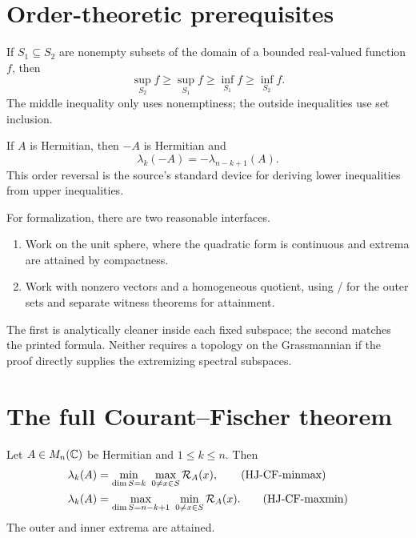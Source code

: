 \section{Order-theoretic prerequisites}


If $S_1\subseteq S_2$ are nonempty subsets of the domain of a bounded real-valued function $f$, then
\begin{equation}
  \sup_{S_2}f\ge\sup_{S_1}f\ge\inf_{S_1}f\ge\inf_{S_2}f. \tag{HJ-set-chain}
\end{equation}
The middle inequality only uses nonemptiness; the outside inequalities use set inclusion.

If $A$ is Hermitian, then $-A$ is Hermitian and
\begin{equation}
  \lambda_k(-A)=-\lambda_{n-k+1}(A). \tag{HJ-neg-spectrum}
\end{equation}
This order reversal is the source's standard device for deriving lower inequalities from upper inequalities.

For formalization, there are two reasonable interfaces.
\begin{enumerate}[leftmargin=2em]
\item Work on the unit sphere, where the quadratic form is continuous and extrema are attained by compactness.
\item Work with nonzero vectors and a homogeneous quotient, using / for the outer sets and separate witness theorems for attainment.
\end{enumerate}
The first is analytically cleaner inside each fixed subspace; the second matches the printed formula. Neither requires a topology on the Grassmannian if the proof directly supplies the extremizing spectral subspaces.

\section{The full Courant--Fischer theorem}


\begin{theorem}
Let $A\in M_n(\mathbb{C})$ be Hermitian and $1\le k\le n$. Then
\begin{align}
  \lambda_k(A)
  &=\min_{\dim S=k}\ \max_{0\ne x\in S}\mathcal{R}_{A}(x), \tag{HJ-CF-minmax}\\
  \lambda_k(A)
  &=\max_{\dim S=n-k+1}\ \min_{0\ne x\in S}\mathcal{R}_{A}(x). \tag{HJ-CF-maxmin}
\end{align}
The outer and inner extrema are attained.
\end{theorem}

